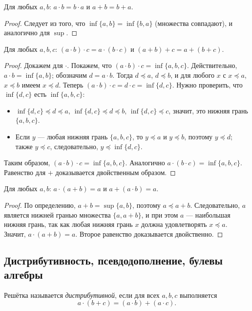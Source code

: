 \documentclass[10pt]{article}
\begin{document}
\begin{theorem}[Коммутативность]
Для любых $a,b$: $a \cdot b = b \cdot a$ и $a + b = b + a$.
\end{theorem}
\begin{proof}
Следует из того, что $\inf\{a,b\} = \inf\{b,a\}$ (множества совпадают), и аналогично для $\sup$.
\end{proof}

\begin{theorem}[Ассоциативность]
Для любых $a,b,c$: $(a \cdot b) \cdot c = a \cdot (b \cdot c)$ и $(a + b) + c = a + (b + c)$.
\end{theorem}
\begin{proof}
Докажем для $\cdot$. Покажем, что $(a \cdot b) \cdot c = \inf\{a,b,c\}$. Действительно, $a \cdot b = \inf\{a,b\}$; обозначим $d = a \cdot b$. Тогда $d \preceq a$, $d \preceq b$, и для любого $x$ с $x \preceq a$, $x \preceq b$ имеем $x \preceq d$. Теперь $(a \cdot b) \cdot c = d \cdot c = \inf\{d,c\}$. Нужно проверить, что $\inf\{d,c\}$ есть $\inf\{a,b,c\}$:
\begin{itemize}
    \item $\inf\{d,c\} \preceq d \preceq a$, $\inf\{d,c\} \preceq d \preceq b$, $\inf\{d,c\} \preceq c$, значит, это нижняя грань $\{a,b,c\}$.
    \item Если $y$ — любая нижняя грань $\{a,b,c\}$, то $y \preceq a$ и $y \preceq b$, поэтому $y \preceq d$; также $y \preceq c$, следовательно, $y \preceq \inf\{d,c\}$.
\end{itemize}
Таким образом, $(a \cdot b) \cdot c = \inf\{a,b,c\}$. Аналогично $a \cdot (b \cdot c) = \inf\{a,b,c\}$. Равенство для $+$ доказывается двойственным образом.
\end{proof}

\begin{theorem}[Поглощение]
Для любых $a,b$: $a \cdot (a + b) = a$ и $a + (a \cdot b) = a$.
\end{theorem}
\begin{proof}
По определению, $a + b = \sup\{a,b\}$, поэтому $a \preceq a+b$. Следовательно, $a$ является нижней гранью множества $\{a, a+b\}$, и при этом $a$ — наибольшая нижняя грань, так как любая нижняя грань $x$ должна удовлетворять $x \preceq a$. Значит, $a \cdot (a+b) = a$. Второе равенство доказывается двойственно.
\end{proof}

\subsection{Дистрибутивность, псевдодополнение, булевы алгебры}
\begin{definition}
Решётка называется \emph{дистрибутивной}, если для всех $a,b,c$ выполняется
$$ a\cdot(b+c) = (a\cdot b)+(a\cdot c). $$
\end{definition}
\end{document}
